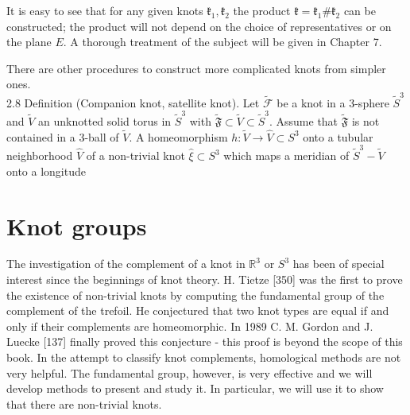 \documentclass[10pt, letterpaper]{article}
\begin{document}
It is easy to see that for any given knots $\mathfrak{k}_{1}, \mathfrak{k}_{2}$ the product $\mathfrak{k}=\mathfrak{k}_{1} \# \mathfrak{k}_{2}$ can be constructed; the product will not depend on the choice of representatives or on the plane $E$. A thorough treatment of the subject will be given in Chapter 7.

There are other procedures to construct more complicated knots from simpler ones.\\
2.8 Definition (Companion knot, satellite knot). Let $\widetilde{\mathcal{F}}$ be a knot in a 3-sphere $\widetilde{S}^{3}$ and $\widetilde{V}$ an unknotted solid torus in $\widetilde{S}^{3}$ with $\widetilde{\mathfrak{F}} \subset \widetilde{V} \subset \widetilde{S}^{3}$. Assume that $\widetilde{\mathfrak{F}}$ is not contained in a 3-ball of $\widetilde{V}$. A homeomorphism $h: \widetilde{V} \rightarrow \widehat{V} \subset S^{3}$ onto a tubular neighborhood $\widehat{V}$ of a non-trivial knot $\widehat{\xi} \subset S^{3}$ which maps a meridian of $\widetilde{S}^{3}-\widetilde{V}$ onto a longitude



\pagebreak

\section{Knot groups}

The investigation of the complement of a knot in $\mathbb{R}^{3}$ or $S^{3}$ has been of special interest since the beginnings of knot theory. H. Tietze [350] was the first to prove the existence of non-trivial knots by computing the fundamental group of the complement of the trefoil. He conjectured that two knot types are equal if and only if their complements are homeomorphic. In 1989 C. M. Gordon and J. Luecke [137] finally proved this conjecture - this proof is beyond the scope of this book. In the attempt to classify knot complements, homological methods are not very helpful. The fundamental group, however, is very effective and we will develop methods to present and study it. In particular, we will use it to show that there are non-trivial knots.
\end{document}
